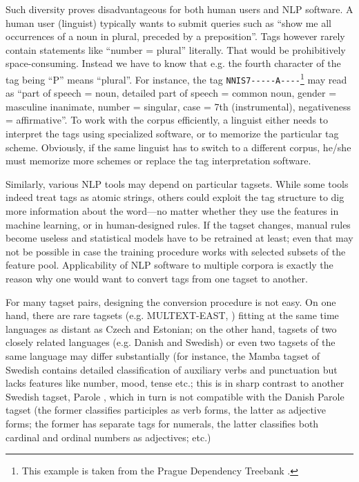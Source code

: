 \documentclass[11pt]{article}
\begin{document}
Such diversity proves disadvantageous for both human users and NLP software. A human user (linguist) typically wants to submit queries such as “show me all occurrences of a noun in plural, preceded by a preposition”. Tags however rarely contain statements like “number = plural” literally. That would be prohibitively space-consuming. Instead we have to know that e.g. the fourth character of the tag being “P” means “plural”. For instance, the tag \texttt{NNIS7-{}-{}-{}-{}-A-{}-{}-{}-}\footnote{This example is taken from the Prague Dependency Treebank \citep{pdt}.} may read as “part of speech = noun, detailed part of speech = common noun, gender = masculine inanimate, number = singular, case = 7th (instrumental), negativeness = affirmative”. To work with the corpus efficiently, a linguist either needs to interpret the tags using specialized software, or to memorize the particular tag scheme. Obviously, if the same linguist has to switch to a different corpus, he/she must memorize more schemes or replace the tag interpretation software.

Similarly, various NLP tools may depend on particular tagsets. While some tools indeed treat tags as atomic strings, others could exploit the tag structure to dig more information about the word—no matter whether they use the features in machine learning, or in human-designed rules. If the tagset changes, manual rules become useless and statistical models have to be retrained at least; even that may not be possible in case the training procedure works with selected subsets of the feature pool. Applicability of NLP software to multiple corpora is exactly the reason why one would want to convert tags from one tagset to another.

For many tagset pairs, designing the conversion procedure is not easy. On one hand, there are rare tagsets (e.g. MULTEXT-EAST, \citet{multext-east}) fitting at the same time languages as distant as Czech and Estonian; on the other hand, tagsets of two closely related languages (e.g. Danish and Swedish) or even two tagsets of the same language may differ substantially (for instance, the Mamba tagset of Swedish \citep{talbanken} contains detailed classification of auxiliary verbs and punctuation but lacks features like number, mood, tense etc.; this is in sharp contrast to another Swedish tagset, Parole \citep{parolesv}, which in turn is not compatible with the Danish Parole \citep{paroleda} tagset (the former classifies participles as verb forms, the latter as adjective forms; the former has separate tags for numerals, the latter classifies both cardinal and ordinal numbers as adjectives; etc.)
\end{document}
